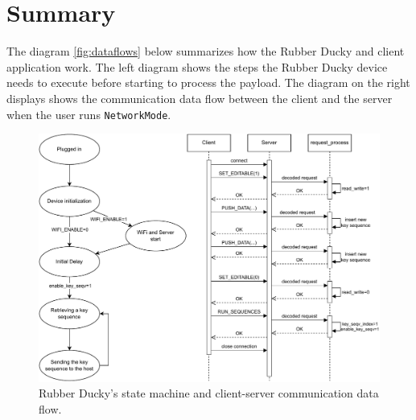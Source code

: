 \section{Summary}
The diagram \autoref{fig:dataflows} below summarizes how the Rubber Ducky and client application work. The left diagram shows the steps the Rubber Ducky device needs to execute before starting to process the payload. The diagram on the right displays shows the communication data flow between the client and the server when the user runs \verb|NetworkMode|.
\begin{figure}[ht]
    \centering
    \includegraphics[width=0.85\linewidth]{obrazky-figures/summary_diagram.pdf}
    \caption{Rubber Ducky's state machine and client-server communication data flow.}
    \label{fig:dataflows}
\end{figure}

